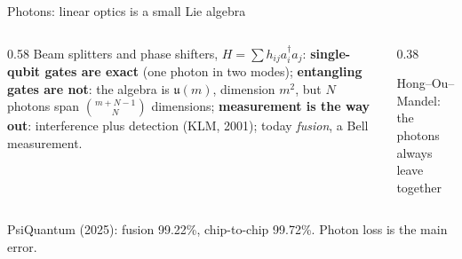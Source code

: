 \documentclass[aspectratio=169,11pt]{beamer}
\newcommand{\ket}[1]{|#1\rangle}
\begin{document}
\begin{frame}{Photons: linear optics is a small Lie algebra}
  \begin{columns}[c]
    \begin{column}{0.58\textwidth}
      Beam splitters and phase shifters, $H=\sum h_{ij}a_i^\dagger a_j$:
      \vskip1mm
      \textbf{single-qubit gates are exact} (one photon in two modes);
      \vskip1mm
      \textbf{entangling gates are not}: the algebra is $\mathfrak u(m)$, dimension $m^2$, but $N$ photons span $\binom{m+N-1}{N}$ dimensions;
      \vskip1mm
      \textbf{measurement is the way out}: interference plus detection (KLM, 2001); today \emph{fusion}, a Bell measurement.
    \end{column}
    \begin{column}{0.38\textwidth}
      \centering
      \par
      {\small Hong--Ou--Mandel: the photons always leave together}
    \end{column}
  \end{columns}
  \begin{takeaway}PsiQuantum (2025): fusion 99.22\%, chip-to-chip 99.72\%. Photon loss is the main error.\end{takeaway}
\end{frame}
\end{document}
